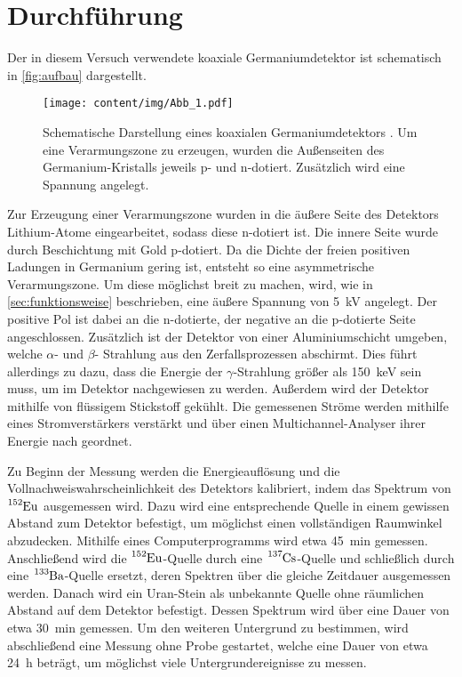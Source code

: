 \section{Durchführung}
\label{sec:durchfuehrung}

Der in diesem Versuch verwendete koaxiale Germaniumdetektor ist schematisch in \autoref{fig:aufbau} dargestellt.
\begin{figure}
    \centering
    \texttt{[image: content/img/Abb\_1.pdf]}
    \caption{
        Schematische Darstellung eines koaxialen Germaniumdetektors \cite{versuchsanleitung}.
        Um eine Verarmungszone zu erzeugen,
        wurden die Außenseiten des Germanium-Kristalls jeweils p- und n-dotiert.
        Zusätzlich wird eine Spannung angelegt.
    }
    \label{fig:aufbau}
\end{figure}

Zur Erzeugung einer Verarmungszone wurden in die äußere Seite des Detektors Lithium-Atome eingearbeitet,
sodass diese n-dotiert ist.
Die innere Seite wurde durch Beschichtung mit Gold p-dotiert.
Da die Dichte der freien positiven Ladungen in Germanium gering ist,
entsteht so eine asymmetrische Verarmungszone.
Um diese möglichst breit zu machen,
wird,
wie in \autoref{sec:funktionsweise} beschrieben,
eine äußere Spannung von \SI{5}{\kilo\volt} angelegt.
Der positive Pol ist dabei an die n-dotierte,
der negative an die p-dotierte Seite angeschlossen.
Zusätzlich ist der Detektor von einer Aluminiumschicht umgeben,
welche $\alpha$- und $\beta$- Strahlung aus den Zerfallsprozessen abschirmt.
Dies führt allerdings zu dazu,
dass die Energie der $\gamma$-Strahlung größer als \SI{150}{\kilo\eV} sein muss,
um im Detektor nachgewiesen zu werden.
Außerdem wird der Detektor mithilfe von flüssigem Stickstoff gekühlt.
Die gemessenen Ströme werden mithilfe eines Stromverstärkers verstärkt und über einen Multichannel-Analyser ihrer Energie nach geordnet.

Zu Beginn der Messung werden die Energieauflösung und die Vollnachweiswahrscheinlichkeit des Detektors kalibriert,
indem das Spektrum von $\ce{^152Eu}$ ausgemessen wird.
Dazu wird eine entsprechende Quelle in einem gewissen Abstand zum Detektor befestigt,
um möglichst einen vollständigen Raumwinkel abzudecken.
Mithilfe eines Computerprogramms wird etwa \SI{45}{\minute} gemessen.
Anschließend wird die $\ce{^152Eu}$-Quelle durch eine $\ce{^137Cs}$-Quelle und schließlich durch eine $\ce{^133Ba}$-Quelle ersetzt,
deren Spektren über die gleiche Zeitdauer ausgemessen werden.
Danach wird ein Uran-Stein als unbekannte Quelle ohne räumlichen Abstand auf dem Detektor befestigt.
Dessen Spektrum wird über eine Dauer von etwa \SI{30}{\minute} gemessen.
Um den weiteren Untergrund zu bestimmen,
wird abschließend eine Messung ohne Probe gestartet,
welche eine Dauer von etwa \SI{24}{\hour} beträgt,
um möglichst viele Untergrundereignisse zu messen.
